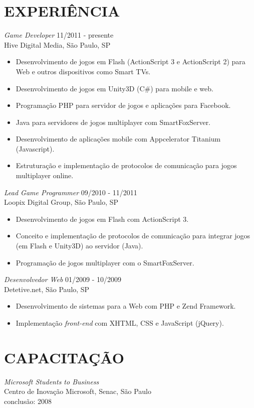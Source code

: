 \documentclass[line,margin]{res}
\begin{document}
\begin{resume}
\section{EXPERIÊNCIA} {\sl Game Developer} \hfill 11/2011 - presente \\
                Hive Digital Media, São Paulo, SP
                 \begin{itemize}  \itemsep -2pt
                 \item Desenvolvimento de jogos em Flash (ActionScript 3 e ActionScript 2) para Web e outros dispositivos como Smart TVs.
		 \item Desenvolvimento de jogos em Unity3D (C\#) para mobile e web.
                 \item Programação PHP para servidor de jogos e aplicações para Facebook.
                 \item Java para servidores de jogos multiplayer com SmartFoxServer.
		 \item Desenvolvimento de aplicações mobile com Appcelerator Titanium (Javascript).
                 \item Estruturação e implementação de protocolos de comunicação para jogos multiplayer online.
                 \end{itemize}
                 
                 {\sl Lead Game Programmer} \hfill 09/2010 - 11/2011 \\
                Loopix Digital Group, São Paulo, SP
                 \begin{itemize}  \itemsep -2pt
                 \item Desenvolvimento de jogos em Flash com ActionScript 3.
                 \item Conceito e implementação de protocolos de comunicação para integrar jogos (em Flash e Unity3D) ao servidor (Java).
                 \item Programação de jogos multiplayer com o SmartFoxServer.
                 \end{itemize}
 
                {\sl Desenvolvedor Web} \hfill 01/2009 - 10/2009 \\
                Detetive.net, São Paulo, SP
                 \begin{itemize}  \itemsep -3pt
                 \item Desenvolvimento de sistemas para a Web com PHP e Zend Framework.
                 \item Implementação {\sl front-end} com XHTML, CSS e JavaScript (jQuery).
                 \end{itemize} 

\section{CAPACITAÇÃO}             
           {\sl Microsoft Students to Business} \\
                Centro de Inovação Microsoft, Senac, São Paulo \\
                conclusão: 2008 

\end{resume}
\end{document}
